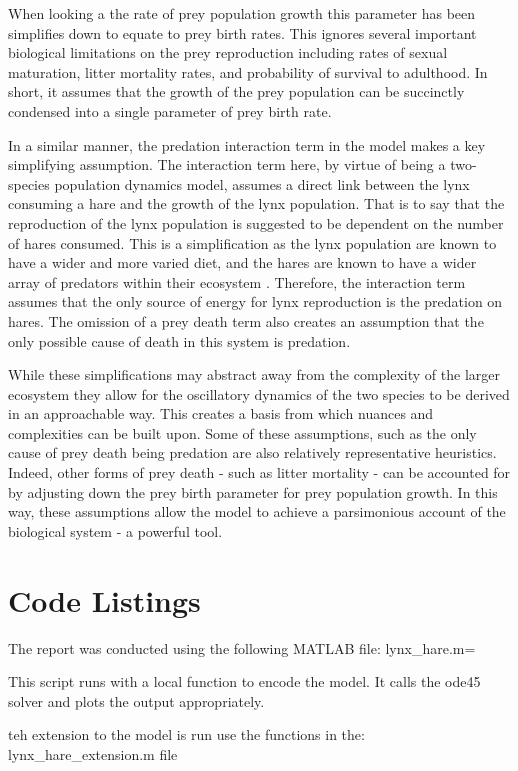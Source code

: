 \documentclass{article}
\begin{document}
When looking a the rate of prey population growth this parameter has been simplifies down to equate to prey birth rates. This ignores several important biological limitations on the prey reproduction including rates of sexual maturation, litter mortality rates, and probability of survival to adulthood. In short, it assumes that the growth of the prey population can be succinctly condensed into a single parameter of prey birth rate. 

In a similar manner, the predation interaction term in the model makes a key simplifying assumption. The interaction term here, by virtue of being a two-species population dynamics model, assumes a direct link between the lynx consuming a hare and the growth of the lynx population. That is to say that the reproduction of the lynx population is suggested to be dependent on the number of hares consumed. This is a simplification as the lynx population are known to have a wider and more varied diet, and the hares are known to have a wider array of predators within their ecosystem \parencite{king_geometry_2001, stenseth_population_1997}. Therefore, the interaction term assumes that the only source of energy for lynx reproduction is the predation on hares. The omission of a prey death term also creates an assumption that the only possible cause of death in this system is predation. 

While these simplifications may abstract away from the complexity of the larger ecosystem they allow for the oscillatory dynamics of the two species to be derived in an approachable way. This creates a basis from which nuances and complexities can be built upon. Some of these assumptions, such as the only cause of prey death being predation are also relatively representative heuristics. Indeed, other forms of prey death - such as litter mortality - can be accounted for by adjusting down the prey birth parameter for prey population growth. In this way, these assumptions allow the model to achieve a parsimonious account of the biological system - a powerful tool. 

\clearpage
\section{Code Listings}
The report was conducted using the following MATLAB file: lynx\_hare.m= 

This script runs with a local function to encode the model. It calls the ode45 solver and plots the output appropriately. 

teh extension to the model is run use the functions in the: lynx\_hare\_extension.m file
\end{document}
